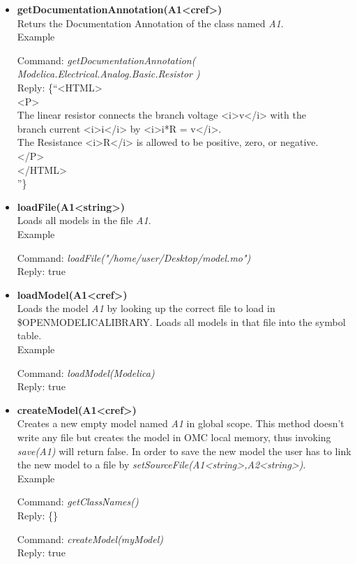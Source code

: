 \documentclass[11pt,a4paper,oneside,english]{book}
\newenvironment{modelicaExamples}{\begin{itemize}}{\end{itemize}}
\newcommand{\api}[2]{\item \textbf{#1} \\ #2}
\newcommand{\command}[1]{Command: \textit{#1}\\}
\newcommand{\reply}[1]{Reply: #1}
\newcommand{\functionex}[2]{\begin{singlespace} \command{#1} \reply{#2} \end{singlespace}}
\newcommand{\examples}{Example}
\begin{document}
\begin{modelicaExamples}
{		\functionex{getDiagramAnnotation(Modelica.Electrical.Analog.Basic.Re\-si\-stor)}
		{\begin{scriptsize}\{-100.0, -100.0, 100.0, 100.0, \{Rectangle (true, \{0, 0, 255\},
\{0,0,0\}, LinePattern.Solid, FillPattern.None, 0.25, BorderPattern.None, \{\{-70.0,30.0\}, 
\{70.0,-30.0\}\}, 0.0), Line (true, \{\{-96.0,0.0\}, \{-70.0, 0.0\}\}, \{0,0,255\}, LinePattern.Solid, 0.25, 
\{Arrow.None,Arrow.None\}, 3.0, false), Line(true, \{\{70.0,0.0\}, \{96.0,0.0\}\}, 
\{0,0,255\}, LinePattern.Solid,0.25, 
\{Arrow.None,Arrow.None\}, 3.0, false)\}\}
		\end{scriptsize}}
		}
		
		\api{getDocumentationAnnotation(A1<cref>)}{Returs the Documentation Annotation of the class named \textit{A1}.\\
		\examples
		\functionex{getDocumentationAnnotation( Modelica.Electrical.Analog.Ba\-sic.Re\-sistor )}
		{\{``<HTML>\\
		<P>\\
		The linear resistor connects the branch voltage <i>v</i> with the\\
		branch current <i>i</i> by <i>i*R = v</i>.\\
		The Resistance <i>R</i> is allowed to be positive, zero, or negative.\\
		</P>\\
		</HTML>\\
		''\}}
		}
		
		\api{loadFile(A1<string>)}{Loads all models in the file \textit{A1}.\\
		\examples
		\functionex{loadFile("/home/user/Desktop/model.mo")}
		{true}
		}
		
		\api{loadModel(A1<cref>)}{Loads the model \textit{A1} by looking up the correct file to load in                   \$OPENMODELICALIBRARY. Loads all models in that file into the symbol table.\\
		\examples
		\functionex{loadModel(Modelica)}
		{true}
		}
		
		\api{createModel(A1<cref>)}{Creates a new empty model named \textit{A1} in global scope.
		This method doesn't write any file but creates the model in OMC local memory, thus invoking \textit{save(A1)} will return false. In order to save the new model the user has to link the new model to a file by \textit{setSourceFile(A1<string>,A2<string>)}.\\
		\examples
		\functionex{getClassNames()}
		{\{\}}
		
		\functionex{createModel(myModel)}
		{true}
		
}
\end{modelicaExamples}
\end{document}
